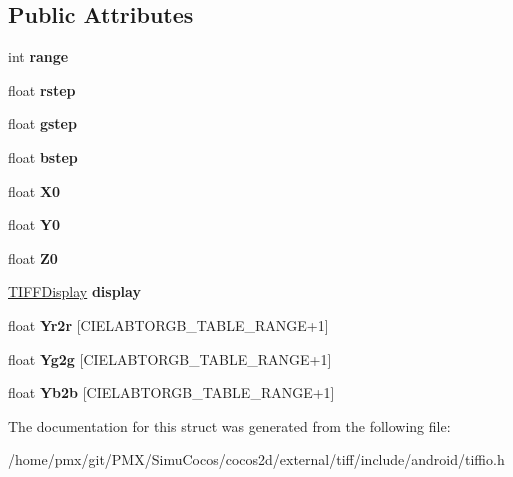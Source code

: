 \subsection*{Public Attributes}
\begin{DoxyCompactItemize}
\item 
\mbox{\label{structTIFFCIELabToRGB_a09af471c6d9ffcca9c19de97f20920ff}} 
int {\bfseries range}
\item 
\mbox{\label{structTIFFCIELabToRGB_a9b213644566df7faeb5b9fec670d471e}} 
float {\bfseries rstep}
\item 
\mbox{\label{structTIFFCIELabToRGB_aa8377803e7a29c4a2febe3bb072d56b2}} 
float {\bfseries gstep}
\item 
\mbox{\label{structTIFFCIELabToRGB_a31b54e135a7ba968e985d3d87df1cbd8}} 
float {\bfseries bstep}
\item 
\mbox{\label{structTIFFCIELabToRGB_a5af05f3959746297faad382d4789d9df}} 
float {\bfseries X0}
\item 
\mbox{\label{structTIFFCIELabToRGB_ae11810aa51c4bfb3f9ff132c04cfb05c}} 
float {\bfseries Y0}
\item 
\mbox{\label{structTIFFCIELabToRGB_a66f412761ac9c5c752e5d63b16fec950}} 
float {\bfseries Z0}
\item 
\mbox{\label{structTIFFCIELabToRGB_a95a9dabc0ec6759e6cd85c51fcae72ec}} 
\hyperlink{structTIFFDisplay}{T\+I\+F\+F\+Display} {\bfseries display}
\item 
\mbox{\label{structTIFFCIELabToRGB_a4e48176bcffff9c23e5e972a92b70f9a}} 
float {\bfseries Yr2r} \mbox{[}C\+I\+E\+L\+A\+B\+T\+O\+R\+G\+B\+\_\+\+T\+A\+B\+L\+E\+\_\+\+R\+A\+N\+GE+1\mbox{]}
\item 
\mbox{\label{structTIFFCIELabToRGB_ae5e388d7a478e501c937867d60fc2775}} 
float {\bfseries Yg2g} \mbox{[}C\+I\+E\+L\+A\+B\+T\+O\+R\+G\+B\+\_\+\+T\+A\+B\+L\+E\+\_\+\+R\+A\+N\+GE+1\mbox{]}
\item 
\mbox{\label{structTIFFCIELabToRGB_a1e6b051751895d60716779ea4bca7da6}} 
float {\bfseries Yb2b} \mbox{[}C\+I\+E\+L\+A\+B\+T\+O\+R\+G\+B\+\_\+\+T\+A\+B\+L\+E\+\_\+\+R\+A\+N\+GE+1\mbox{]}
\end{DoxyCompactItemize}


The documentation for this struct was generated from the following file\+:\begin{DoxyCompactItemize}
\item 
/home/pmx/git/\+P\+M\+X/\+Simu\+Cocos/cocos2d/external/tiff/include/android/tiffio.\+h\end{DoxyCompactItemize}
